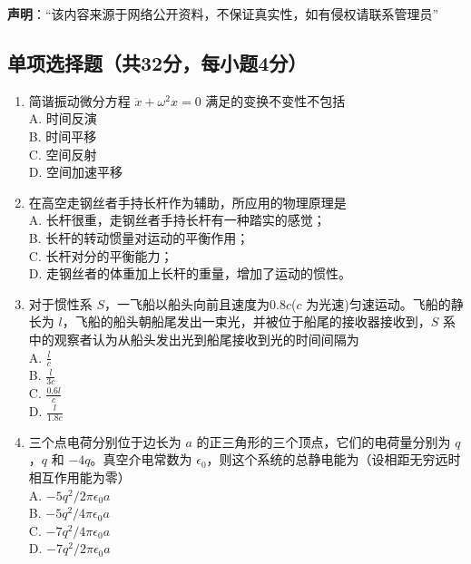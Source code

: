 
\textbf{声明}：“该内容来源于网络公开资料，不保证真实性，如有侵权请联系管理员”

\subsection{单项选择题（共32分，每小题4分）}
\begin{enumerate}
\item 简谐振动微分方程 $\ddot{x}+{\omega}^2{x}=0$ 满足的变换不变性不包括\\
A. 时间反演\\
B. 时间平移\\
C. 空间反射\\
D. 空间加速平移\\

\item 在高空走钢丝者手持长杆作为辅助，所应用的物理原理是\\
A. 长杆很重，走钢丝者手持长杆有一种踏实的感觉；\\
B. 长杆的转动惯量对运动的平衡作用；\\
C. 长杆对分的平衡能力；\\
D. 走钢丝者的体重加上长杆的重量，增加了运动的惯性。\\

\item 对于惯性系 $S$，一飞船以船头向前且速度为0.8$c$($c$ 为光速)匀速运动。飞船的静长为 $l$，飞船的船头朝船尾发出一束光，并被位于船尾的接收器接收到，$S$ 系中的观察者认为从船头发出光到船尾接收到光的时间间隔为\\
A. $\frac{l}{c}$\\
B. $\frac{l}{3c}$\\
C. $\frac{0.6l}{c}$\\
D. $\frac{l}{1.8c}$\\

\item 三个点电荷分别位于边长为 $a$ 的正三角形的三个顶点，它们的电荷量分别为 $q$，$q$ 和 $-4q$。真空介电常数为 $\epsilon_{0}$，则这个系统的总静电能为（设相距无穷远时相互作用能为零）\\
A. $-5q^{2}/2\pi \epsilon_{0} a$\\
B. $-5q^{2}/4\pi \epsilon_{0} a$\\
C. $-7q^{2}/4\pi \epsilon_{0} a$\\
D. $-7q^{2}/2\pi \epsilon_{0} a$\\


\end{enumerate}
